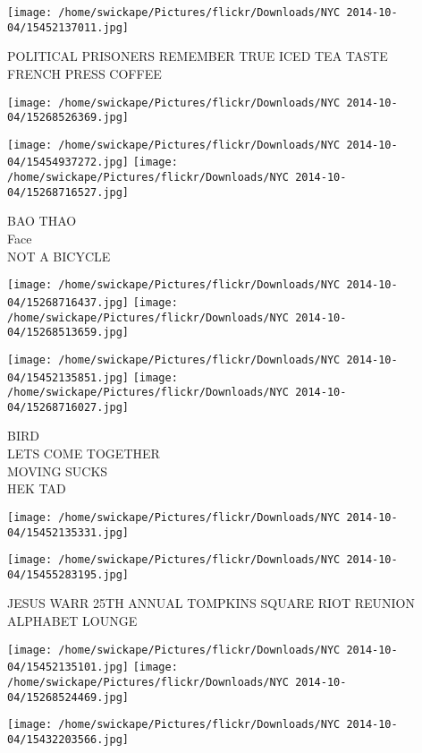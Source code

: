 \documentclass[10pt,letterpaper]{article}
\begin{document}
\vspace{0.25in}
\texttt{[image: /home/swickape/Pictures/flickr/Downloads/NYC 2014-10-04/15452137011.jpg]}

POLITICAL PRISONERS REMEMBER TRUE ICED TEA TASTE\\
FRENCH PRESS COFFEE
\pagebreak

\texttt{[image: /home/swickape/Pictures/flickr/Downloads/NYC 2014-10-04/15268526369.jpg]}

\vspace{0.25in}
\texttt{[image: /home/swickape/Pictures/flickr/Downloads/NYC 2014-10-04/15454937272.jpg]}
\texttt{[image: /home/swickape/Pictures/flickr/Downloads/NYC 2014-10-04/15268716527.jpg]}

BAO THAO\\
Face\\
NOT A BICYCLE
\pagebreak

\texttt{[image: /home/swickape/Pictures/flickr/Downloads/NYC 2014-10-04/15268716437.jpg]}
\texttt{[image: /home/swickape/Pictures/flickr/Downloads/NYC 2014-10-04/15268513659.jpg]}

\texttt{[image: /home/swickape/Pictures/flickr/Downloads/NYC 2014-10-04/15452135851.jpg]}
\texttt{[image: /home/swickape/Pictures/flickr/Downloads/NYC 2014-10-04/15268716027.jpg]}

BIRD\\
LETS COME TOGETHER\\
MOVING SUCKS\\
HEK TAD
\pagebreak

\texttt{[image: /home/swickape/Pictures/flickr/Downloads/NYC 2014-10-04/15452135331.jpg]}

\vspace{0.25in}
\texttt{[image: /home/swickape/Pictures/flickr/Downloads/NYC 2014-10-04/15455283195.jpg]}

JESUS WARR 25TH ANNUAL TOMPKINS SQUARE RIOT REUNION\\
ALPHABET LOUNGE
\pagebreak

\texttt{[image: /home/swickape/Pictures/flickr/Downloads/NYC 2014-10-04/15452135101.jpg]}
\texttt{[image: /home/swickape/Pictures/flickr/Downloads/NYC 2014-10-04/15268524469.jpg]}

\vspace{0.25in}
\texttt{[image: /home/swickape/Pictures/flickr/Downloads/NYC 2014-10-04/15432203566.jpg]}
\end{document}
